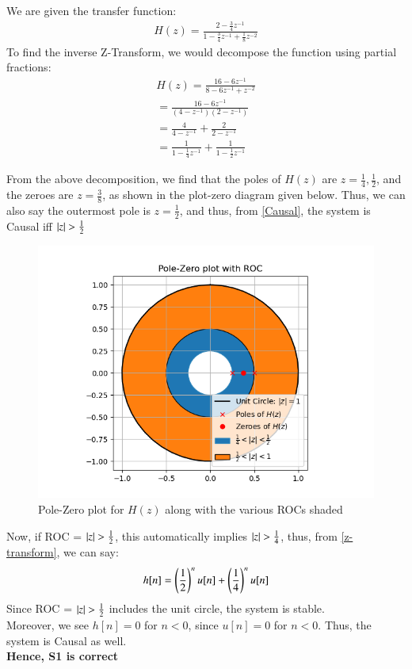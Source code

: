 \documentclass[journal,12pt,twocolumn]{IEEEtran}
\begin{document}
We are given the transfer function:
\begin{align}
    H(z) = \frac{2 - \frac{3}{4}z^{-1}}{1 - \frac{3}{4}z^{-1} + \frac{1}{8}z^{-2}}
\end{align}
To find the inverse Z-Transform, we would decompose the function using partial fractions:
\begin{align}
    H(z) = \frac{16 - 6z^{-1}}{8 - 6z^{-1} + z^{-2}}\\
     = \frac{16 - 6z^{-1}}{(4 - z^{-1})(2 - {z^{-1}})}\\
      = \frac{4}{4 - z^{-1}} +\frac{2}{2 - z^{-1}}\\
       = \frac{1}{1 - \frac{1}{4}z^{-1}} + \frac{1}{1 - \frac{1}{2}z^{-1}}
       \label{partial-fraction}
\end{align}

From the above decomposition, we find that the poles of $H(z)$ are $z = \frac{1}{4} , \frac{1}{2}$, and the zeroes are $z = \frac{3}{8}$, as shown in the plot-zero diagram given below.
Thus, we can also say the outermost pole is $z = \frac{1}{2}$, and thus, from \eqref{Causal}, the system is Causal iff $\left\vert z\right\vert > \frac{1}{2}$

 \begin{figure}[!ht]
\centering
 \includegraphics[width=\columnwidth]{Graphs/pole_zero_with_ROC.png}
 \caption{Pole-Zero plot for $H(z)$ along with the various ROCs shaded}
 \end{figure}

Now, if ROC = $\left\vert z\right\vert>\frac{1}{2}$, this automatically implies $\left\vert z\right\vert > \frac{1}{4}$, thus, from \eqref{z-transform}, we can say:
\begin{align}
    h[n] = \left(\frac{1}{2}\right)^n u[n] + \left(\frac{1}{4}\right)^n u[n] 
\end{align}
Since ROC = $\left\vert z\right\vert>\frac{1}{2}$ includes the unit circle, the system is stable.\\
Moreover, we see $h[n] = 0 $
 for $n < 0$, since $u[n] = 0$ for $n< 0$. Thus, the system is Causal as well.\\\textbf{ Hence, S1 is correct}\\
 
\end{document}
